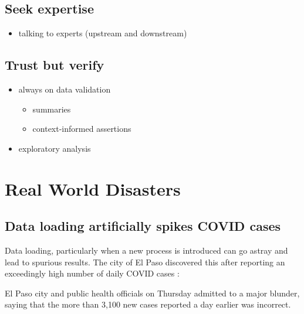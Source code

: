 \documentclass[
]{krantz}
\providecommand{\tightlist}{%
  \setlength{\itemsep}{0pt}\setlength{\parskip}{0pt}}
\renewenvironment{quote}{\begin{VF}}{\end{VF}}
\begin{document}
\hypertarget{seek-expertise}{%
\subsection{Seek expertise}\label{seek-expertise}}

\begin{itemize}
\tightlist
\item
  talking to experts (upstream and downstream)
\end{itemize}

\hypertarget{trust-but-verify}{%
\subsection{Trust but verify}\label{trust-but-verify}}

\begin{itemize}
\tightlist
\item
  always on data validation

  \begin{itemize}
  \tightlist
  \item
    summaries
  \item
    context-informed assertions
  \end{itemize}
\item
  exploratory analysis
\end{itemize}

\hypertarget{real-world-disasters}{%
\section{Real World Disasters}\label{real-world-disasters}}

\hypertarget{data-loading-artificially-spikes-covid-cases}{%
\subsection{Data loading artificially spikes COVID cases}\label{data-loading-artificially-spikes-covid-cases}}

Data loading, particularly when a new process is introduced can go astray and lead to spurious results.
The city of El Paso discovered this after reporting an exceedingly high number of daily COVID cases \citep{borunda_2020}:

\begin{quote}
El Paso city and public health officials on Thursday admitted to a major blunder, saying that the more than 3,100 new cases reported a day earlier was incorrect.
\end{quote}
\end{document}
